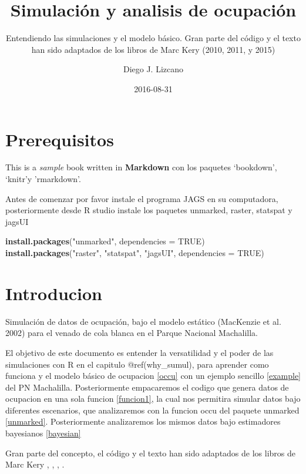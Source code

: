 \documentclass[]{book}
\title{Simulación y analisis de ocupación}
\subtitle{Entendiendo las simulaciones y el modelo básico. Gran parte del código y
el texto han sido adaptados de los libros de Marc Kery (2010, 2011, y
2015)}
\author{Diego J. Lizcano}
\date{2016-08-31}
\newenvironment{Shaded}{\begin{snugshade}}{\end{snugshade}}
\newcommand{\KeywordTok}[1]{\textcolor[rgb]{0.13,0.29,0.53}{\textbf{{#1}}}}
\newcommand{\DataTypeTok}[1]{\textcolor[rgb]{0.13,0.29,0.53}{{#1}}}
\newcommand{\StringTok}[1]{\textcolor[rgb]{0.31,0.60,0.02}{{#1}}}
\newcommand{\OtherTok}[1]{\textcolor[rgb]{0.56,0.35,0.01}{{#1}}}
\newcommand{\NormalTok}[1]{{#1}}
\begin{document}
\maketitle

{
\hypersetup{linkcolor=black}
\setcounter{tocdepth}{1}
\tableofcontents
}
\chapter{Prerequisitos}\label{prerequisitos}

This is a \emph{sample} book written in \textbf{Markdown} con los
paquetes `bookdown', `knitr'y 'rmarkdown'.

Antes de comenzar por favor instale el programa JAGS en su computadora,
posteriormente desde R studio instale los paquetes unmarked, raster,
statspat y jagsUI

\begin{Shaded}
\begin{Highlighting}[]
\KeywordTok{install.packages}\NormalTok{(}\StringTok{"unmarked"}\NormalTok{, }\DataTypeTok{dependencies =} \OtherTok{TRUE}\NormalTok{)}
\KeywordTok{install.packages}\NormalTok{(}\StringTok{"raster"}\NormalTok{, }\StringTok{"statspat"}\NormalTok{, }\StringTok{"jagsUI"}\NormalTok{, }\DataTypeTok{dependencies =} \OtherTok{TRUE}\NormalTok{)}
\end{Highlighting}
\end{Shaded}

\chapter{Introducion}\label{intro}

Simulación de datos de ocupación, bajo el modelo estático (MacKenzie et
al. 2002) para el venado de cola blanca en el Parque Nacional
Machalilla.

El objetivo de este documento es entender la versatilidad y el poder de
las simulaciones con R en el capitulo @ref(why\_sumul), para aprender
como funciona y el modelo básico de ocupacion \ref{occu} con un ejemplo
sencillo \ref{example} del PN Machalilla. Posteriormente empacaremos el
codigo que genera datos de ocupacion en una sola funcion \ref{funcion1},
la cual nos permitira simular datos bajo diferentes escenarios, que
analizaremos con la funcion occu del paquete unmarked \ref{unmarked}.
Posteriormente analizaremos los mismos datos bajo estimadores bayesianos
\ref{bayesian}

Gran parte del concepto, el código y el texto han sido adaptados de los
libros de Marc Kery \citep{Kery2012}, \citep{Kery2011a},
\citep{Kery2010}, \citep{kery2015applied}.
\end{document}
